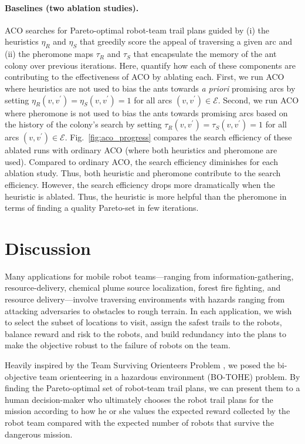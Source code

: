 \documentclass[11pt, oneside]{article}
\begin{document}
\paragraph{Baselines (two ablation studies).}
ACO searches for Pareto-optimal robot-team trail plans guided by (i) the heuristics $\eta_R$ and $\eta_S$ that greedily score the appeal of traversing a given arc and (ii) the pheromone maps $\tau_R$ and $\tau_S$ that encapsulate the memory of the ant colony over previous iterations. Here, quantify how each of these components are contributing to the effectiveness of ACO by ablating each. 
First, we run ACO where heuristics are not used to bias the ants towards \emph{a priori} promising arcs by setting $\eta_R(v, v^\prime)=\eta_S(v, v^\prime)=1$ for all arcs $(v, v^\prime)\in \mathcal{E}$. Second, we run ACO where pheromone is not used to bias the ants towards promising arcs based on the history of the colony's search by setting $\tau_R(v, v^\prime)=\tau_S(v, v^\prime)=1$ for all arcs $(v, v^\prime)\in \mathcal{E}$.
Fig.~\ref{fig:aco_progress} compares the search efficiency of these ablated runs with ordinary ACO (where both heuristics and pheromone are used).
Compared to ordinary ACO, the search efficiency diminishes for each ablation study. 
Thus, both heuristic and pheromone contribute to the search efficiency.
However, the search efficiency drops more dramatically when the heuristic is ablated. 
Thus, the heuristic is more helpful than the pheromone in terms of finding a quality Pareto-set in few iterations. 

\section{Discussion}
Many applications for mobile robot teams---ranging from information-gathering, resource-delivery, chemical plume source localization, forest fire fighting, and resource delivery---involve traversing environments with hazards ranging from attacking adversaries to obstacles to rough terrain. 
In each application, we wish to select the subset of locations to visit, assign the safest trails to the robots, balance reward and risk to the robots, and build redundancy into the plans to make the objective robust to the failure of robots on the team. 

Heavily inspired by the Team Surviving Orienteers Problem \cite{jorgensen2018team,jorgensen2017matroid,jorgensen2024matroid}, we posed the bi-objective team orienteering in a hazardous environment (BO-TOHE) problem. 
By finding the Pareto-optimal set of robot-team trail plans, we can present them to a human decision-maker who ultimately chooses the robot trail plans for the mission according to how he or she values the expected reward collected by the robot team compared with the expected number of robots that survive the dangerous mission.
\end{document}
